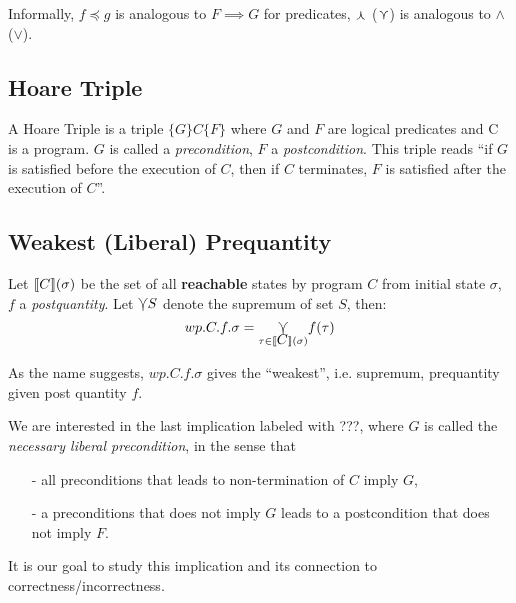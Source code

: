 \documentclass[adraft,hidelinks]{eptcs}
\begin{document}
Informally, $f\preceq g$ is analogous to $F\implies G$ for predicates, $\curlywedge$ ($\curlyvee$) is analogous to $\wedge$ ($\vee$). 

\subsection{Hoare Triple}
A Hoare Triple is a triple $ \{G\} C \{F\}$ where $G$ and $F$ are logical predicates and C is a program. 
$G$ is called a \textit{precondition}, $F$ a \textit{postcondition}. 
This triple reads ``if $G$ is satisfied before the execution of $C$, then if $C$ terminates, $F$ is satisfied after the execution of $C$''. 

\subsection{Weakest (Liberal) Prequantity}
Let $\bkt C (\sigma)$ be the set of all \textbf{reachable} states by program $C$ from initial state $\sigma$, $f$ a \textit{postquantity}. 
Let $\varcurlyvee S$ denote the supremum of set $S$, then: 
\[wp.C.f.\sigma = \underset{\tau\in\bkt C(\sigma)}{\bigmeet} f(\tau)\]

As the name suggests, $wp.C.f.\sigma$ gives the ``weakest'', i.e. supremum, prequantity given post quantity $f$. 


\begin{comment}
We can now use some implications to define correctness or incorrectness as shown in \tab{impl}. 
\begin{table}\centering 
    \begin{tabular}{cc}
      \textbf{implication}&\textbf{defines}    \\ \hline
      $G\implies wp(C,F)$&   total correctness   \\
      $G\implies wlp(C,F)$&  partial correctness\\
      $wp(C,F)\implies G$&  partial incorrectness\\
      $wlp(C,F)\implies G$&  ???\\
    \end{tabular}
    \caption{implications using wp and wlp\cite{Zhang2022}}
    \label{tab:impl}
\end{table}    
\end{comment}

We are interested in the last implication labeled with ???, where $G$ is called the \textit{necessary liberal precondition}, in the sense that 
\begin{itemize}
    \item [-] all preconditions that leads to non-termination of $C$ imply $G$, 
    \item [-] a preconditions that does not imply $G$ leads to a postcondition that does not imply $F$. 
\end{itemize}
It is our goal to study this implication and its connection to correctness/incorrectness. 
\end{document}
